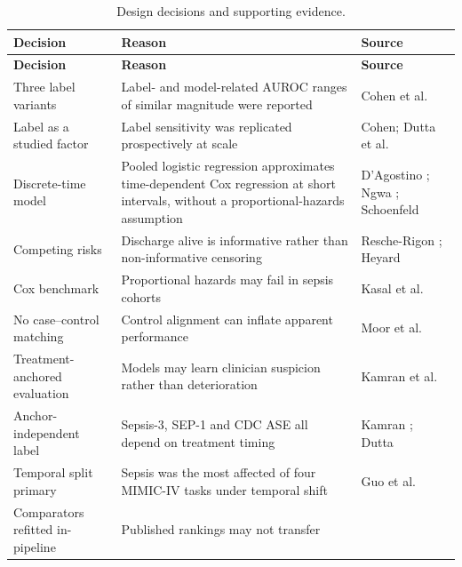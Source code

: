 {\small
\begin{longtable}{p{3.1cm}p{5.6cm}p{4cm}}
    \caption{Design decisions and supporting evidence.}\label{tab:design_warrant}\\
    \toprule
    \textbf{Decision} & \textbf{Reason} & \textbf{Source} \\
    \midrule
    \endfirsthead
    \toprule
    \textbf{Decision} & \textbf{Reason} & \textbf{Source} \\
    \midrule
    \endhead
    \bottomrule
    \endfoot

        Three label variants & Label- and model-related AUROC ranges of
        similar magnitude were reported &
        Cohen et al.\ \cite{cohen2024subtle} \\
        Label as a studied factor & Label sensitivity was replicated
        prospectively at scale &
        Cohen; Dutta et al.\ \cite{dutta2026performance} \\
        Discrete-time model & Pooled logistic regression approximates
        time-dependent Cox regression at short intervals, without a
        proportional-hazards assumption &
        D'Agostino \cite{dagostino1990pooled};
        Ngwa \cite{ngwa2016comparison};
        Schoenfeld \cite{schoenfeld2006survival} \\
        Competing risks & Discharge alive is informative rather than
        non-informative censoring &
        Resche-Rigon \cite{rescherigon2006competing};
        Heyard \cite{heyard2019dynamic} \\
        Cox benchmark & Proportional hazards may fail in sepsis cohorts &
        Kasal et al.\ \cite{kasal2004cox} \\
        No case--control matching & Control alignment can inflate apparent
        performance &
        Moor et al.\ \cite{moor2021review} \\
        Treatment-anchored evaluation & Models may learn clinician suspicion
        rather than deterioration &
        Kamran et al.\ \cite{kamran2024evaluation} \\
        Anchor-independent label & Sepsis-3, SEP-1 and CDC ASE all depend on
        treatment timing &
        Kamran \cite{kamran2024evaluation};
        Dutta \cite{dutta2026performance} \\
        Temporal split primary & Sepsis was the most affected of four MIMIC-IV
        tasks under temporal shift &
        Guo et al.\ \cite{guo2022temporal} \\
        Comparators refitted in-pipeline & Published rankings may not transfer

\end{longtable}}

